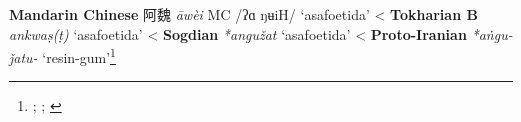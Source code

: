 \begin{etymology}\label{ety:awei}
\textbf{Mandarin Chinese} {阿魏} \textit{āwèi} MC /ʔɑ ŋʉiH/ `asafoetida'
< \textbf{Tokharian B} \textit{ankwaṣ(ṭ)} `asafoetida'
< \textbf{Sogdian} \textit{*angužat} `asafoetida'
< \textbf{Proto-Iranian} \textit{*aṅgu-ǰatu-} `resin-gum'\footnote{\textcite{leung_itinerary_2019}; \textcite[353]{laufer_sino-iranica_1919}; \textcite[438]{tremblay_irano-tocharica_2005}}
\end{etymology}
